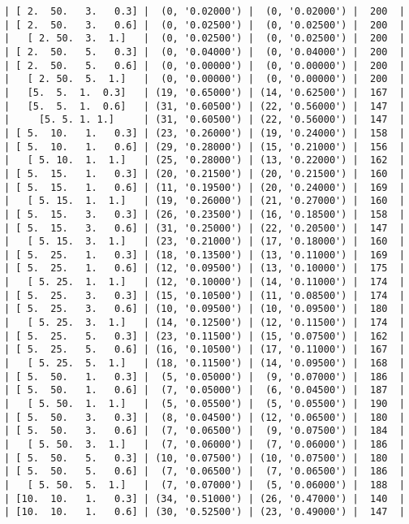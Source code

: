 \documentclass{article}
\begin{document}
\begin{verbatim}
| [ 2.  50.   3.   0.3] |  (0, '0.02000') |  (0, '0.02000') |  200  |
| [ 2.  50.   3.   0.6] |  (0, '0.02500') |  (0, '0.02500') |  200  |
|   [ 2. 50.  3.  1.]   |  (0, '0.02500') |  (0, '0.02500') |  200  |
| [ 2.  50.   5.   0.3] |  (0, '0.04000') |  (0, '0.04000') |  200  |
| [ 2.  50.   5.   0.6] |  (0, '0.00000') |  (0, '0.00000') |  200  |
|   [ 2. 50.  5.  1.]   |  (0, '0.00000') |  (0, '0.00000') |  200  |
|   [5.  5.  1.  0.3]   | (19, '0.65000') | (14, '0.62500') |  167  |
|   [5.  5.  1.  0.6]   | (31, '0.60500') | (22, '0.56000') |  147  |
|     [5. 5. 1. 1.]     | (31, '0.60500') | (22, '0.56000') |  147  |
| [ 5.  10.   1.   0.3] | (23, '0.26000') | (19, '0.24000') |  158  |
| [ 5.  10.   1.   0.6] | (29, '0.28000') | (15, '0.21000') |  156  |
|   [ 5. 10.  1.  1.]   | (25, '0.28000') | (13, '0.22000') |  162  |
| [ 5.  15.   1.   0.3] | (20, '0.21500') | (20, '0.21500') |  160  |
| [ 5.  15.   1.   0.6] | (11, '0.19500') | (20, '0.24000') |  169  |
|   [ 5. 15.  1.  1.]   | (19, '0.26000') | (21, '0.27000') |  160  |
| [ 5.  15.   3.   0.3] | (26, '0.23500') | (16, '0.18500') |  158  |
| [ 5.  15.   3.   0.6] | (31, '0.25000') | (22, '0.20500') |  147  |
|   [ 5. 15.  3.  1.]   | (23, '0.21000') | (17, '0.18000') |  160  |
| [ 5.  25.   1.   0.3] | (18, '0.13500') | (13, '0.11000') |  169  |
| [ 5.  25.   1.   0.6] | (12, '0.09500') | (13, '0.10000') |  175  |
|   [ 5. 25.  1.  1.]   | (12, '0.10000') | (14, '0.11000') |  174  |
| [ 5.  25.   3.   0.3] | (15, '0.10500') | (11, '0.08500') |  174  |
| [ 5.  25.   3.   0.6] | (10, '0.09500') | (10, '0.09500') |  180  |
|   [ 5. 25.  3.  1.]   | (14, '0.12500') | (12, '0.11500') |  174  |
| [ 5.  25.   5.   0.3] | (23, '0.11500') | (15, '0.07500') |  162  |
| [ 5.  25.   5.   0.6] | (16, '0.10500') | (17, '0.11000') |  167  |
|   [ 5. 25.  5.  1.]   | (18, '0.11500') | (14, '0.09500') |  168  |
| [ 5.  50.   1.   0.3] |  (5, '0.05000') |  (9, '0.07000') |  186  |
| [ 5.  50.   1.   0.6] |  (7, '0.05000') |  (6, '0.04500') |  187  |
|   [ 5. 50.  1.  1.]   |  (5, '0.05500') |  (5, '0.05500') |  190  |
| [ 5.  50.   3.   0.3] |  (8, '0.04500') | (12, '0.06500') |  180  |
| [ 5.  50.   3.   0.6] |  (7, '0.06500') |  (9, '0.07500') |  184  |
|   [ 5. 50.  3.  1.]   |  (7, '0.06000') |  (7, '0.06000') |  186  |
| [ 5.  50.   5.   0.3] | (10, '0.07500') | (10, '0.07500') |  180  |
| [ 5.  50.   5.   0.6] |  (7, '0.06500') |  (7, '0.06500') |  186  |
|   [ 5. 50.  5.  1.]   |  (7, '0.07000') |  (5, '0.06000') |  188  |
| [10.  10.   1.   0.3] | (34, '0.51000') | (26, '0.47000') |  140  |
| [10.  10.   1.   0.6] | (30, '0.52500') | (23, '0.49000') |  147  |

\end{verbatim}
\end{document}

